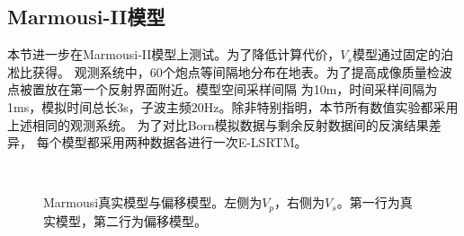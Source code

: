 \subsection{Marmousi-II模型}
本节进一步在Marmousi-II模型上测试。为了降低计算代价，$V_s$模型通过固定的泊凇比获得。
观测系统中，60个炮点等间隔地分布在地表。为了提高成像质量检波点被置放在第一个反射界面附近。模型空间采样间隔
为10m，时间采样间隔为1ms，模拟时间总长3s，子波主频20Hz。除非特别指明，本节所有数值实验都采用上述相同的观测系统。
为了对比Born模拟数据与剩余反射数据间的反演结果差异，
每个模型都采用两种数据各进行一次E-LSRTM。
\begin{figure}[!htb]
   \centering
   \\
   \caption{Marmousi真实模型与偏移模型。左侧为$V_p$，右侧为$V_s$。第一行为真实模型，第二行为偏移模型。}
   \label{fig:TrueAndInitial_1}
\end{figure}
